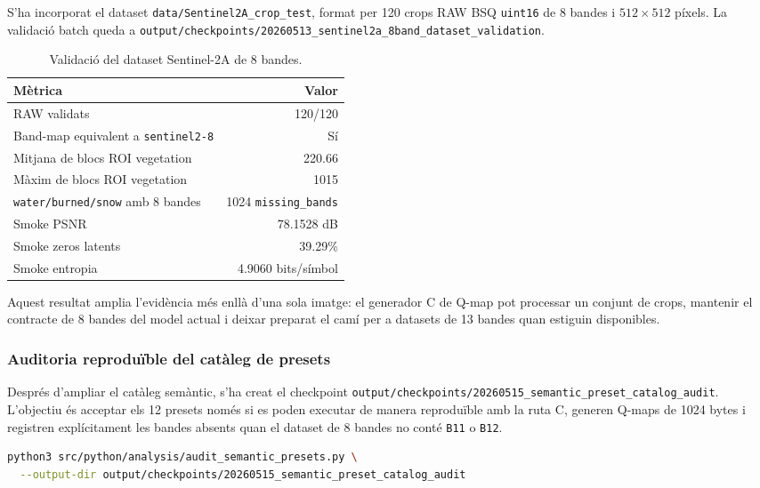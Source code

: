 \documentclass[11pt,a4paper]{article}
\begin{document}
S'ha incorporat el dataset \texttt{data/Sentinel2A\_crop\_test}, format per 120 crops RAW BSQ \texttt{uint16} de 8 bandes i $512 \times 512$ píxels. La validació batch queda a \texttt{output/checkpoints/20260513\_sentinel2a\_8band\_dataset\_validation}.

\begin{table}[H]
\centering
\begin{tabular}{lr}
\toprule
\textbf{Mètrica} & \textbf{Valor} \\
\midrule
RAW validats & 120/120 \\
Band-map equivalent a \texttt{sentinel2-8} & Sí \\
Mitjana de blocs ROI vegetation & 220.66 \\
Màxim de blocs ROI vegetation & 1015 \\
\texttt{water/burned/snow} amb 8 bandes & 1024 \texttt{missing\_bands} \\
Smoke PSNR & 78.1528 dB \\
Smoke zeros latents & 39.29\% \\
Smoke entropia & 4.9060 bits/símbol \\
\bottomrule
\end{tabular}
\caption{Validació del dataset Sentinel-2A de 8 bandes.}
\end{table}

Aquest resultat amplia l'evidència més enllà d'una sola imatge: el generador C de Q-map pot processar un conjunt de crops, mantenir el contracte de 8 bandes del model actual i deixar preparat el camí per a datasets de 13 bandes quan estiguin disponibles.

\subsubsection{Auditoria reproduïble del catàleg de presets}

Després d'ampliar el catàleg semàntic, s'ha creat el checkpoint \texttt{output/checkpoints/20260515\_semantic\_preset\_catalog\_audit}. L'objectiu és acceptar els 12 presets només si es poden executar de manera reproduïble amb la ruta C, generen Q-maps de 1024 bytes i registren explícitament les bandes absents quan el dataset de 8 bandes no conté \texttt{B11} o \texttt{B12}.

\begin{lstlisting}[language=bash]
python3 src/python/analysis/audit_semantic_presets.py \
  --output-dir output/checkpoints/20260515_semantic_preset_catalog_audit
\end{lstlisting}
\end{document}
